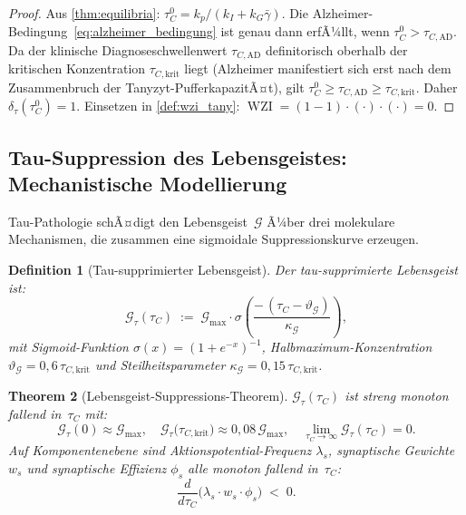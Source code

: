 ﻿\documentclass[12pt,a4paper]{article}
\newtheorem{theorem}{Theorem}[section]
\newtheorem{definition}[theorem]{Definition}
\theoremstyle{definition}
\DeclareMathOperator{\WZI}{WZI}
\begin{document}
	\begin{proof}
		Aus \cref{thm:equilibria}: $\tau_C^0 = k_p/(k_I + k_G\bar{\gamma})$.
		Die Alzheimer-Bedingung~\eqref{eq:alzheimer_bedingung} ist genau dann erfÃ¼llt,
		wenn $\tau_C^0 > \tau_{C,\mathrm{AD}}$.
		Da der klinische Diagnoseschwellenwert $\tau_{C,\mathrm{AD}}$ definitorisch
		oberhalb der kritischen Konzentration $\tau_{C,\mathrm{krit}}$ liegt (Alzheimer
		manifestiert sich erst nach dem Zusammenbruch der Tanyzyt-PufferkapazitÃ¤t), gilt
		$\tau_C^0 \geq \tau_{C,\mathrm{AD}} \geq \tau_{C,\mathrm{krit}}$.
		Daher $\delta_\tau(\tau_C^0) = 1$.
		Einsetzen in \cref{def:wzi_tany}: $\WZI = (1 - 1) \cdot (\cdot) \cdot (\cdot) = 0$.
		
	\end{proof}

	\subsection{Tau-Suppression des Lebensgeistes: Mechanistische Modellierung}

	Tau-Pathologie schÃ¤digt den Lebensgeist~$\mathcal{G}$ Ã¼ber drei molekulare Mechanismen,
	die zusammen eine sigmoidale Suppressionskurve erzeugen.

	\begin{definition}[Tau-supprimierter Lebensgeist]
		\label{def:gtau}
		Der \emph{tau-supprimierte Lebensgeist} ist:
		\[
			\mathcal{G}_\tau(\tau_C)
			\;:=\; \mathcal{G}_{\max} \cdot
			\sigma\!\left(\frac{-\,(\tau_C - \vartheta_\mathcal{G})}{\kappa_\mathcal{G}}\right),
		\]
		mit Sigmoid-Funktion $\sigma(x) = (1+e^{-x})^{-1}$, Halbmaximum-Konzentration
		$\vartheta_\mathcal{G} = 0{,}6\,\tau_{C,\mathrm{krit}}$ und Steilheitsparameter
		$\kappa_\mathcal{G} = 0{,}15\,\tau_{C,\mathrm{krit}}$.
	\end{definition}

	\begin{theorem}[Lebensgeist-Suppressions-Theorem]
		\label{thm:gtau}
		$\mathcal{G}_\tau(\tau_C)$ ist streng monoton fallend in~$\tau_C$ mit:
		\[
			\mathcal{G}_\tau(0) \approx \mathcal{G}_{\max}, \quad
			\mathcal{G}_\tau\!\bigl(\tau_{C,\mathrm{krit}}\bigr) \approx 0{,}08\,\mathcal{G}_{\max},
			\quad
			\lim_{\tau_C \to \infty} \mathcal{G}_\tau(\tau_C) = 0.
		\]
		Auf Komponentenebene sind Aktionspotential-Frequenz $\lambda_s$, synaptische Gewichte
		$w_s$ und synaptische Effizienz $\phi_s$ alle monoton fallend in~$\tau_C$:
		\[
			\frac{d}{d\tau_C}\bigl(\lambda_s \cdot w_s \cdot \phi_s\bigr) \;<\; 0.
		\]
	\end{theorem}
\end{document}
